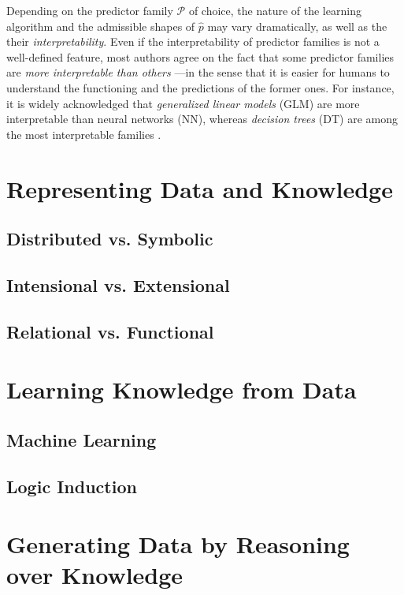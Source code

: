 \documentclass[12pt,a4paper,openright,twoside]{book}
\begin{document}
Depending on the predictor family $\mathcal{P}$ of choice, the nature of the learning algorithm and the admissible shapes of $\hat{p}$ may vary dramatically, as well as the their \emph{interpretability}.
%
Even if the interpretability of predictor families is not a well-defined feature, most authors agree on the fact that some predictor families are \emph{more interpretable than others} \cite{Lipton18}---in the sense that it is easier for humans to understand the functioning and the predictions of the former ones.
%
For instance, it is widely acknowledged that \emph{generalized linear models} (GLM) are more interpretable than neural networks (NN), whereas \emph{decision trees} (DT) \cite{breiman1984classification} are among the most interpretable families \cite{GuidottiMRTGP19}.

\chapter{Representing Data and Knowledge}

\section{Distributed vs. Symbolic}

\section{Intensional vs. Extensional}

\section{Relational vs. Functional}

\chapter{Learning Knowledge from Data}

\section{Machine Learning}

\section{Logic Induction}

\chapter{Generating Data by Reasoning over Knowledge}
\end{document}
